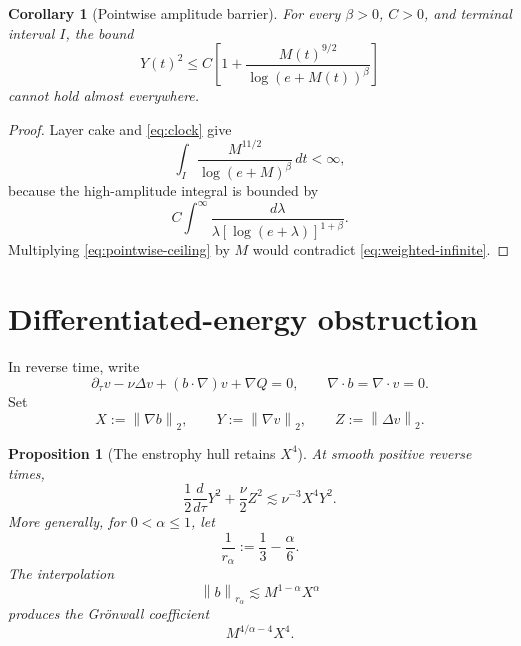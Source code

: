 \documentclass[11pt]{article}
\newtheorem{proposition}[theorem]{Proposition}
\newtheorem{corollary}[theorem]{Corollary}
\theoremstyle{remark}
\newcommand{\norm}[1]{\left\|#1\right\|}
\begin{document}
\begin{corollary}[Pointwise amplitude barrier]
\label{cor:pointwise-barrier}
For every \(\beta>0\), \(C>0\), and terminal interval \(I\), the bound
\begin{equation}
\label{eq:pointwise-ceiling}
 Y(t)^2
 \leq
 C\left[
 1+\frac{M(t)^{9/2}}{\log(e+M(t))^\beta}
 \right]
\end{equation}
cannot hold almost everywhere.
\end{corollary}

\begin{proof}
Layer cake and \eqref{eq:clock} give
\[
 \int_I
 \frac{M^{11/2}}{\log(e+M)^\beta}\,dt
 <\infty,
\]
because the high-amplitude integral is bounded by
\[
 C\int^\infty
 \frac{d\lambda}
 {\lambda[\log(e+\lambda)]^{1+\beta}}.
\]
Multiplying \eqref{eq:pointwise-ceiling} by \(M\) would contradict
\eqref{eq:weighted-infinite}.
\end{proof}

\section{Differentiated-energy obstruction}

In reverse time, write
\begin{equation}
\label{eq:reverse}
 \partial_\tau v-\nu\Delta v
 +(b\cdot\nabla)v+\nabla Q=0,
 \qquad
 \nabla\cdot b=\nabla\cdot v=0.
\end{equation}
Set
\[
 X:=\norm{\nabla b}_2,
 \qquad
 Y:=\norm{\nabla v}_2,
 \qquad
 Z:=\norm{\Delta v}_2.
\]

\begin{proposition}[The enstrophy hull retains \(X^4\)]
\label{prop:X4}
At smooth positive reverse times,
\begin{equation}
\label{eq:X4-basic}
 \frac12\frac d{d\tau}Y^2
 +\frac{\nu}{2}Z^2
 \lesssim
 \nu^{-3}X^4Y^2.
\end{equation}
More generally, for \(0<\alpha\leq1\), let
\[
 \frac1{r_\alpha}:=\frac13-\frac{\alpha}{6}.
\]
The interpolation
\[
 \norm{b}_{r_\alpha}
 \lesssim M^{1-\alpha}X^\alpha
\]
produces the Gr\"onwall coefficient
\begin{equation}
\label{eq:full-X4}
 \boxed{
 M^{4/\alpha-4}X^4.
 }
\end{equation}
\end{proposition}
\end{document}
